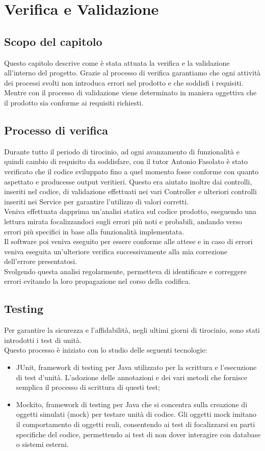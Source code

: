 \chapter{Verifica e Validazione}
\label{cap:verifica-validazione}
\section{Scopo del capitolo}
Questo capitolo descrive come è stata attuata la verifica e la validazione all'interno del progetto. Grazie al processo di verifica garantiamo che ogni attività dei processi svolti non introduca errori nel prodotto e che soddisfi i requisiti. Mentre con il processo di validazione viene determinato in maniera oggettiva che il prodotto sia conforme ai requisiti richiesti.
\section{Processo di verifica}
Durante tutto il periodo di tirocinio, ad ogni avanzamento di funzionalità e quindi cambio di requisito da soddisfare, con il tutor Antonio Fasolato è stato verificato che il codice sviluppato fino a quel momento fosse conforme con quanto aspettato e producesse output veritieri. Questo era aiutato inoltre dai controlli, inseriti nel codice, di validazione effettuati nei vari Controller e ulteriori controlli inseriti nei Service per garantire l’utilizzo di valori corretti.\\
Veniva effettuata dapprima un’analisi statica sul codice prodotto, eseguendo una lettura mirata focalizzandoci sugli errori più noti e probabili, andando verso errori più specifici in base alla funzionalità implementata.\\
Il software poi veniva eseguito per essere conforme alle attese e in caso di errori veniva eseguita un’ulteriore verifica successivamente alla mia correzione dell’errore presentatosi.\\
Svolgendo questa analisi regolarmente, permetteva di identificare e correggere errori evitando la loro propagazione nel corso della codifica.

\section{Testing}
Per garantire la sicurezza e l’affidabilità, negli ultimi giorni di tirocinio, sono stati introdotti i test di unità.\\
Questo processo è iniziato con lo studio delle seguenti tecnologie:
\begin{itemize}
\item JUnit, framework di testing per Java utilizzato per la scrittura e l’esecuzione di test d’unità. L’adozione delle annotazioni e dei vari metodi che fornisce semplica il processo di scrittura di questi test;
\item Mockito, framework di testing per Java che si concentra sulla creazione di oggetti simulati (mock) per testare unità di codice. Gli oggetti mock imitano il comportamento di oggetti reali, consentendo ai test di focalizzarsi su parti specifiche del codice, permettendo ai test di non dover interagire con database o sistemi esterni.
\end{itemize}

